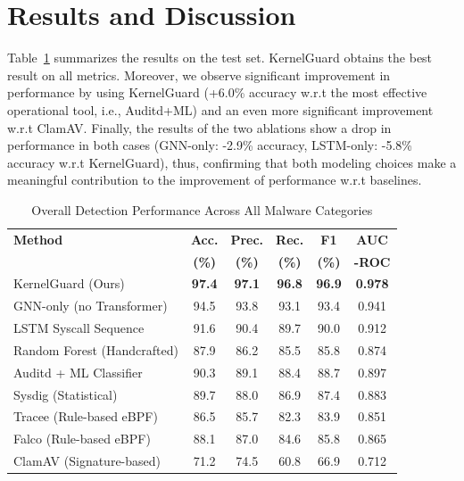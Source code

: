 \documentclass[conference]{IEEEtran}
\begin{document}
\section{Results and Discussion}


Table~\ref{tab:overall} summarizes the results on the test set. KernelGuard obtains the best result on all metrics. Moreover, we observe significant improvement in performance by using KernelGuard (+6.0\% accuracy w.r.t the most effective operational tool, i.e., Auditd+ML) and an even more significant improvement w.r.t ClamAV. Finally, the results of the two ablations show a drop in performance in both cases (GNN-only: -2.9\% accuracy, LSTM-only: -5.8\% accuracy w.r.t KernelGuard), thus, confirming that both modeling choices make a meaningful contribution to the improvement of performance w.r.t baselines.





\begin{table}[t]
\centering
\caption{Overall Detection Performance Across All Malware Categories}
\label{tab:overall}
\begin{tabular}{@{}lccccc@{}}
\toprule
\textbf{Method} & \textbf{Acc.} & \textbf{Prec.} & \textbf{Rec.} & \textbf{F1} & \textbf{AUC} \\
& \textbf{(\%)} & \textbf{(\%)} & \textbf{(\%)} & \textbf{(\%)} & \textbf{-ROC} \\
\midrule
KernelGuard (Ours)          & \textbf{97.4} & \textbf{97.1} & \textbf{96.8} & \textbf{96.9} & \textbf{0.978} \\
GNN-only (no Transformer)   & 94.5 & 93.8 & 93.1 & 93.4 & 0.941 \\
LSTM Syscall Sequence       & 91.6 & 90.4 & 89.7 & 90.0 & 0.912 \\
Random Forest (Handcrafted) & 87.9 & 86.2 & 85.5 & 85.8 & 0.874 \\
Auditd + ML Classifier      & 90.3 & 89.1 & 88.4 & 88.7 & 0.897 \\
Sysdig (Statistical)        & 89.7 & 88.0 & 86.9 & 87.4 & 0.883 \\
Tracee (Rule-based eBPF)    & 86.5 & 85.7 & 82.3 & 83.9 & 0.851 \\
Falco (Rule-based eBPF)     & 88.1 & 87.0 & 84.6 & 85.8 & 0.865 \\
ClamAV (Signature-based)    & 71.2 & 74.5 & 60.8 & 66.9 & 0.712 \\
\bottomrule
\end{tabular}
\end{table}
\end{document}
